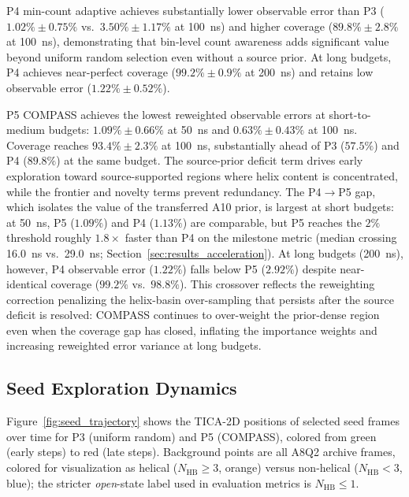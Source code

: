 P4 min-count adaptive achieves substantially lower observable error than P3 ($1.02\% \pm 0.75\%$ vs.\ $3.50\% \pm 1.17\%$ at 100~ns) and higher coverage ($89.8\% \pm 2.8\%$ at 100~ns), demonstrating that bin-level count awareness adds significant value beyond uniform random selection even without a source prior.
At long budgets, P4 achieves near-perfect coverage ($99.2\% \pm 0.9\%$ at 200~ns) and retains low observable error ($1.22\% \pm 0.52\%$).

P5 COMPASS achieves the lowest reweighted observable errors at short-to-medium budgets: $1.09\% \pm 0.66\%$ at 50~ns and $0.63\% \pm 0.43\%$ at 100~ns.
Coverage reaches $93.4\% \pm 2.3\%$ at 100~ns, substantially ahead of P3 ($57.5\%$) and P4 ($89.8\%$) at the same budget.
The source-prior deficit term drives early exploration toward source-supported regions where helix content is concentrated, while the frontier and novelty terms prevent redundancy.
The P4$\to$P5 gap, which isolates the value of the transferred A10 prior, is largest at short budgets: at 50~ns, P5 ($1.09\%$) and P4 ($1.13\%$) are comparable, but P5 reaches the $2\%$ threshold roughly $1.8\times$ faster than P4 on the milestone metric (median crossing 16.0~ns vs.\ 29.0~ns; Section~\ref{sec:results_acceleration}).
At long budgets (200~ns), however, P4 observable error ($1.22\%$) falls below P5 ($2.92\%$) despite near-identical coverage ($99.2\%$ vs.\ $98.8\%$).
This crossover reflects the reweighting correction penalizing the helix-basin over-sampling that persists after the source deficit is resolved: COMPASS continues to over-weight the prior-dense region even when the coverage gap has closed, inflating the importance weights and increasing reweighted error variance at long budgets.

\subsection{Seed Exploration Dynamics}
\label{sec:results_trajectory}

Figure~\ref{fig:seed_trajectory} shows the TICA-2D positions of selected seed frames over time for P3 (uniform random) and P5 (COMPASS), colored from green (early steps) to red (late steps).
Background points are all A8Q2 archive frames, colored for visualization as helical ($N_{\mathrm{HB}}\geq 3$, orange) versus non-helical ($N_{\mathrm{HB}}<3$, blue); the stricter \emph{open}-state label used in evaluation metrics is $N_{\mathrm{HB}}\leq 1$.

